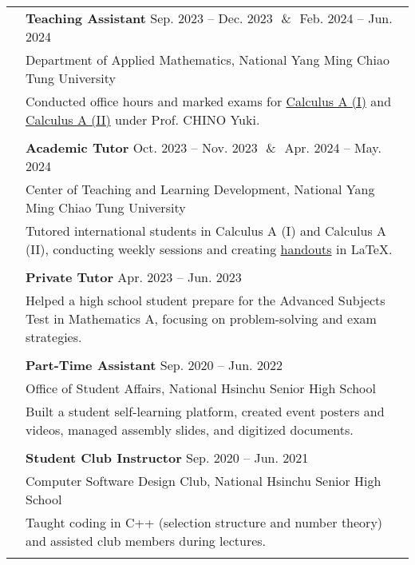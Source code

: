 \documentclass[letterpaper, 11pt]{article}
\begin{document}
\begin{center}
\begin{longtable}{p{0.76in}p{5.93in}}
        & \textbf{Teaching Assistant}  \hfill Sep. 2023 -- Dec. 2023\ \,\&\ \,Feb. 2024 -- Jun. 2024 \\
        & Department of Applied Mathematics, National Yang Ming Chiao Tung University\\
        & Conducted office hours and marked exams for \href{https://reurl.cc/Djp5jN}{Calculus A (I)} and \href{https://reurl.cc/RqoMez}{Calculus A (II)} under Prof. CHINO Yuki.\\
        & \\

        & \textbf{Academic Tutor} \hfill Oct. 2023 -- Nov. 2023\ \,\&\ \,Apr. 2024 -- May. 2024\\
        & Center of Teaching and Learning Development, National Yang Ming Chiao Tung University\\
        & Tutored international students in Calculus A (I) and Calculus A (II), conducting weekly sessions and creating \href{https://github.com/eiken59/2024_II_Tutor}{handouts} in \LaTeX.\\
        & \\

        & \textbf{Private Tutor} \hfill Apr. 2023 -- Jun. 2023 \\
        & Helped a high school student prepare for the Advanced Subjects Test in Mathematics A, focusing on problem-solving and exam strategies.\\
        & \\

        & \textbf{Part-Time Assistant} \hfill Sep. 2020 -- Jun. 2022 \\
        & Office of Student Affairs, National Hsinchu Senior High School\\
        & Built a student self-learning platform, created event posters and videos, managed assembly slides, and digitized documents.\\
        & \\

        & \textbf{Student Club Instructor} \hfill Sep. 2020 -- Jun. 2021 \\
        & Computer Software Design Club, National Hsinchu Senior High School\\
        & Taught coding in C++ (selection structure and number theory) and assisted club members during lectures.\\
        & \\

        

\end{longtable}
\end{center}
\end{document}
